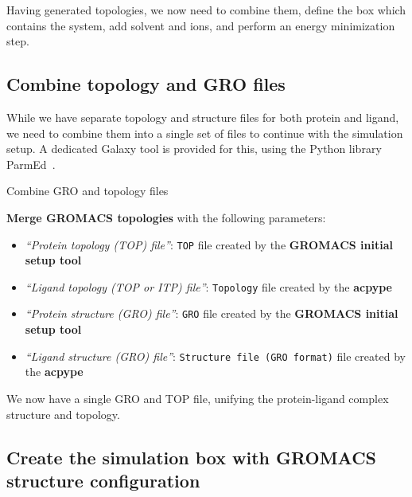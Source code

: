 \documentclass[twocolumn]{bmcart}%
\providecommand{\tightlist}{%
  \setlength{\itemsep}{0pt}\setlength{\parskip}{0pt}}
\begin{document}
Having generated topologies, we now need to combine them, define the box
which contains the system, add solvent and ions, and perform an energy
minimization step.

\subsection*{Combine topology and GRO
files}\label{combine-topology-and-gro-files}

While we have separate topology and structure files for both protein and ligand, we need to combine them into a single set of files to continue with the simulation setup. A dedicated Galaxy tool is provided for this, using the Python library ParmEd~\cite{Swails2016}.

\begin{handson_box_colour}{Combine GRO and topology files}

  \textbf{Merge GROMACS topologies} with the following
  parameters:

  \begin{itemize}
  \tightlist
  \item
    \emph{``Protein topology (TOP) file''}: \texttt{TOP} file created by the \textbf{GROMACS initial setup tool}
  \item
    \emph{``Ligand topology (TOP or ITP) file''}: \texttt{Topology} file created by the \textbf{acpype}
  \item
    \emph{``Protein structure (GRO) file''}: \texttt{GRO} file created by the \textbf{GROMACS initial setup tool}
  \item
    \emph{``Ligand structure (GRO) file''}: \texttt{Structure file (GRO format)} file created by the \textbf{acpype}

  \end{itemize}

\end{handson_box_colour}

We now have a single GRO and TOP file, unifying the protein-ligand complex structure and topology.

\subsection*{\texorpdfstring{Create the simulation box with
\textbf{GROMACS structure
configuration}}{Create the simulation box with GROMACS structure configuration}}\label{create-the-simulation-box-with-gromacs-structure-configuration}
\end{document}

